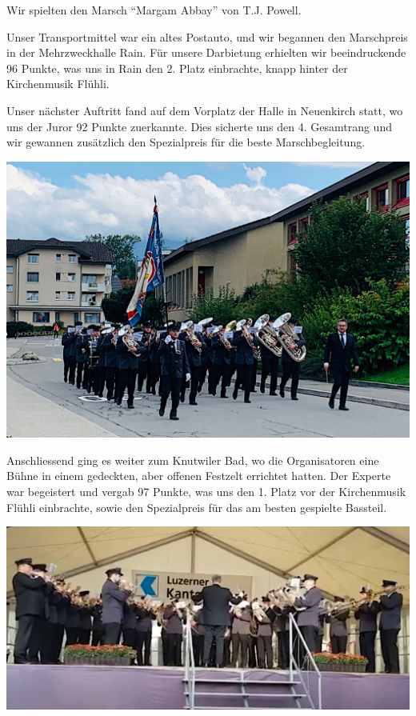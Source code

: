 \begin{history}

    Wir spielten den Marsch \enquote{Margam Abbay} von T.J. Powell.

    Unser Transportmittel war ein altes Postauto, und wir begannen den
    Marschpreis in der Mehrzweckhalle Rain. Für unsere Darbietung erhielten wir
    beeindruckende 96 Punkte, was uns in Rain den 2. Platz einbrachte, knapp
    hinter der Kirchenmusik Flühli.

    Unser nächster Auftritt fand auf dem Vorplatz der Halle in Neuenkirch statt,
    wo uns der Juror 92 Punkte zuerkannte. Dies sicherte uns den 4. Gesamtrang
    und wir gewannen zusätzlich den Spezialpreis für die beste Marschbegleitung.

    \begin{MulticolFigure}
        \centering
        \includegraphics[width=0.93\linewidth]{./chap/2001-2024/2022/Einmarsch-Neuenkirch.jpg}
    \end{MulticolFigure}

    Anschliessend ging es weiter zum Knutwiler Bad, wo die Organisatoren eine
    Bühne in einem gedeckten, aber offenen Festzelt errichtet hatten. Der
    Experte war begeistert und vergab 97 Punkte, was uns den 1. Platz vor der
    Kirchenmusik Flühli einbrachte, sowie den Spezialpreis für das am besten
    gespielte Bassteil.

    \begin{MulticolFigure}
        \centering
        \includegraphics[width=0.9\linewidth]{./chap/2001-2024/2022/Knutwil.jpg}
    \end{MulticolFigure}


\end{history}
